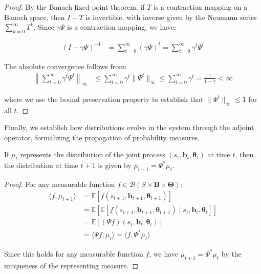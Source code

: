 \begin{proof}
    By the Banach fixed-point theorem, if $T$ is a contraction mapping on a Banach
    space, then $I - T$ is invertible, with inverse given by the Neumann series
    $\sum_{k=0}^{\infty}T^{k}$. Since $\gamma \Psi$ is a contraction mapping, we
    have:

    \begin{align}
        (I - \gamma \Psi)^{-1} & = \sum_{t=0}^{\infty}(\gamma \Psi)^{t} = \sum_{t=0}^{\infty}\gamma^{t} \Psi^{t}
    \end{align}

    The absolute convergence follows from:
    \begin{align}
        \left\|\sum_{t=0}^{\infty}\gamma^{t} \Psi^{t}\right\|_{\infty} & \leq \sum_{t=0}^{\infty}\gamma^{t} \|\Psi^{t}\|_{\infty}\leq \sum_{t=0}^{\infty}\gamma^{t} = \frac{1}{1-\gamma}< \infty
    \end{align}

    where we use the bound preservation property to establish that $\|\Psi^{t}\|_{\infty}
        \leq 1$ for all $t$.
\end{proof}

Finally, we establish how distributions evolve in the system through the adjoint
operator, formalizing the propagation of probability measures.

\begin{lemma}
    If $\mu_{t}$ represents the distribution of the joint process $(s_{t}, \boldsymbol
        {b}_{t}, \boldsymbol{\theta}_{t})$ at time $t$, then the distribution at time
    $t+1$ is given by $\mu_{t+1}= \Psi^{*}\mu_{t}$.
\end{lemma}

\begin{proof}
    For any measurable function $f \in \mathcal{B}(S \times \boldsymbol{B}\times \boldsymbol
        {\Theta})$:
    \begin{align}
        \langle f, \mu_{t+1}\rangle & = \mathbb{E}[f(s_{t+1}, \boldsymbol{b}_{t+1}, \boldsymbol{\theta}_{t+1})]                                                                     \\
                                    & = \mathbb{E}[\mathbb{E}[f(s_{t+1}, \boldsymbol{b}_{t+1}, \boldsymbol{\theta}_{t+1}) \mid s_{t}, \boldsymbol{b}_{t}, \boldsymbol{\theta}_{t}]] \\
                                    & = \mathbb{E}[(\Psi f)(s_{t}, \boldsymbol{b}_{t}, \boldsymbol{\theta}_{t})]                                                                    \\
                                    & = \langle \Psi f, \mu_{t} \rangle = \langle f, \Psi^{*}\mu_{t} \rangle
    \end{align}

    Since this holds for any measurable function $f$, we have
    $\mu_{t+1}= \Psi^{*}\mu_{t}$ by the uniqueness of the representing measure.
\end{proof}

